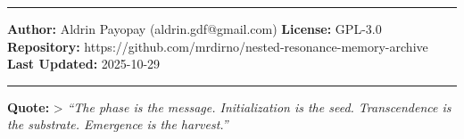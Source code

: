 \documentclass[
]{article}
\begin{document}
\begin{center}\rule{0.5\linewidth}{0.5pt}\end{center}

\textbf{Author:} Aldrin Payopay (aldrin.gdf@gmail.com) \textbf{License:}
GPL-3.0 \textbf{Repository:}
https://github.com/mrdirno/nested-resonance-memory-archive \textbf{Last
Updated:} 2025-10-29

\begin{center}\rule{0.5\linewidth}{0.5pt}\end{center}

\textbf{Quote:} \textgreater{} \emph{``The phase is the message.
Initialization is the seed. Transcendence is the substrate. Emergence is
the harvest.''}
\end{document}

